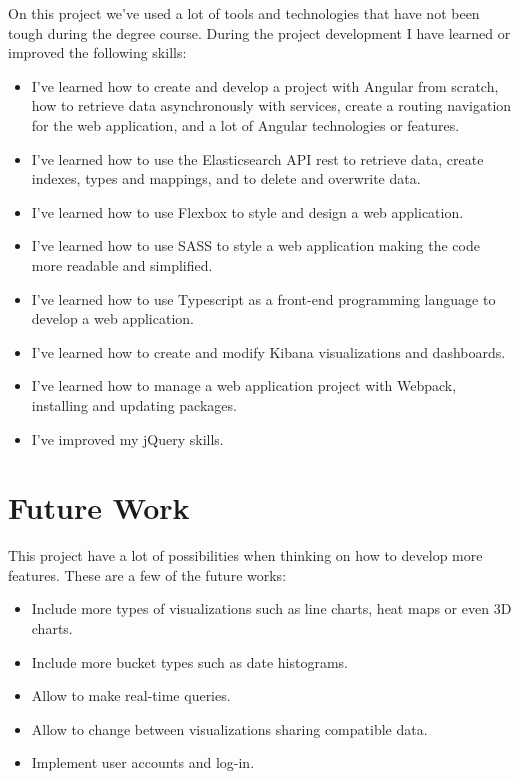 \documentclass[a4paper, 12pt, english]{book}
\begin{document}
On this project we've used a lot of tools and technologies that have not been tough during the degree course. During the project development I have learned or improved the following skills:
\begin{itemize}
    \item I've learned how to create and develop a project with Angular from scratch, how to retrieve data asynchronously with services, create a routing navigation for the web application, and a lot of Angular technologies or features.
    \item I've learned how to use the Elasticsearch API rest to retrieve data, create indexes, types and mappings, and to delete and overwrite data.
    \item I've learned how to use Flexbox to style and design a web application.
    \item I've learned how to use SASS to style a web application making the code more readable and simplified.
    \item I've learned how to use Typescript as a front-end programming language to develop a web application.
    \item I've learned how to create and modify Kibana visualizations and dashboards.
    \item I've learned how to manage a web application project with Webpack, installing and updating packages.
    \item I've improved my jQuery skills.
\end{itemize}




\section{Future Work}
\label{sec:future-work}
This project have a lot of possibilities when thinking on how to develop more features. These are a few of the future works:
\begin{itemize}
    \item Include more types of visualizations such as line charts, heat maps or even 3D charts.
    \item Include more bucket types such as date histograms.
    \item Allow to make real-time queries.
    \item Allow to change between visualizations sharing compatible data.
    \item Implement user accounts and log-in.
\end{itemize}
\end{document}
